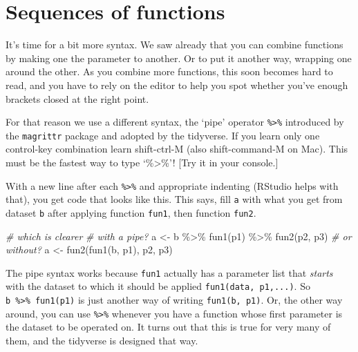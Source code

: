 \documentclass[
]{book}
\newenvironment{Shaded}{\begin{snugshade}}{\end{snugshade}}
\newcommand{\CommentTok}[1]{\textcolor[rgb]{0.56,0.35,0.01}{\textit{#1}}}
\newcommand{\FunctionTok}[1]{\textcolor[rgb]{0.00,0.00,0.00}{#1}}
\newcommand{\NormalTok}[1]{#1}
\newcommand{\OtherTok}[1]{\textcolor[rgb]{0.56,0.35,0.01}{#1}}
\newcommand{\SpecialCharTok}[1]{\textcolor[rgb]{0.00,0.00,0.00}{#1}}
\begin{document}
\hypertarget{sequences-of-functions}{%
\section{Sequences of functions}\label{sequences-of-functions}}

It's time for a bit more syntax. We saw already that you can combine functions by making one the parameter to another. Or to put it another way, wrapping one around the other. As you combine more functions, this soon becomes hard to read, and you have to rely on the editor to help you spot whether you've enough brackets closed at the right point.

For that reason we use a different syntax, the `pipe' operator \texttt{\%\textgreater{}\%} introduced by the \texttt{magrittr} package and adopted by the tidyverse. If you learn only one control-key combination learn shift-ctrl-M (also shift-command-M on Mac). This must be the fastest way to type `\%\textgreater\%'! {[}Try it in your console.{]}

With a new line after each \texttt{\%\textgreater{}\%} and appropriate indenting (RStudio helps with that), you get code that looks like this. This says, fill \texttt{a} with what you get from dataset \texttt{b} after applying function \texttt{fun1}, then function \texttt{fun2}.

\begin{Shaded}
\begin{Highlighting}[]
\CommentTok{\# which is clearer}
\CommentTok{\# with a pipe?}
\NormalTok{a }\OtherTok{\textless{}{-}}\NormalTok{ b }\SpecialCharTok{\%\textgreater{}\%} 
  \FunctionTok{fun1}\NormalTok{(p1) }\SpecialCharTok{\%\textgreater{}\%} 
  \FunctionTok{fun2}\NormalTok{(p2, p3)}
\CommentTok{\# or without?}
\NormalTok{a }\OtherTok{\textless{}{-}} \FunctionTok{fun2}\NormalTok{(}\FunctionTok{fun1}\NormalTok{(b, p1), p2, p3)}
\end{Highlighting}
\end{Shaded}

The pipe syntax works because \texttt{fun1} actually has a parameter list that \emph{starts} with the dataset to which it should be applied \texttt{fun1(data,\ p1,...)}. So \texttt{b\ \%\textgreater{}\%\ fun1(p1)} is just another way of writing \texttt{fun1(b,\ p1)}. Or, the other way around, you can use \texttt{\%\textgreater{}\%} whenever you have a function whose first parameter is the dataset to be operated on. It turns out that this is true for very many of them, and the tidyverse is designed that way.
\end{document}
